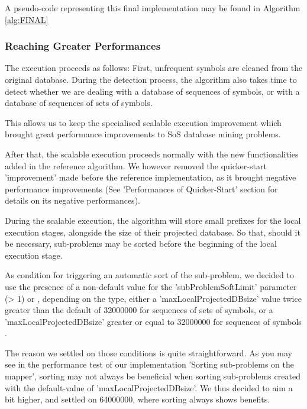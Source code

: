 \documentclass{eplmastersthesis}
\begin{document}
A pseudo-code representing this final implementation may be found in Algorithm \ref{alg:FINAL}

\subsubsection{Reaching Greater Performances}

The execution proceeds as follows: First, unfrequent symbols are cleaned from the original database. During the detection process, the algorithm also takes time to detect whether we are dealing with a database of sequences of symbols, or with a database of sequences of sets of symbols.\newline

This allows us to keep the specialised scalable execution improvement which brought great performance improvements to SoS database mining problems. \newline

After that, the scalable execution proceeds normally with the new functionalities added in the reference algorithm. We however removed the quicker-start 'improvement' made before the reference implementation, as it brought negative performance improvements (See 'Performances of Quicker-Start' section for details on its negative performances). \newline

During the scalable execution, the algorithm will store small prefixes for the local execution stages, alongside the size of their projected database. So that, should it be necessary, sub-problems may be sorted before the beginning of the local execution stage. \newline

As condition for triggering an automatic sort of the sub-problem, we decided to use the presence of a non-default value for the 'subProblemSoftLimit' parameter (> 1) or , depending on the type, either a 'maxLocalProjectedDBsize' value twice greater than the default of 32000000 for sequences of sets of symbols, or a 'maxLocalProjectedDBsize' greater or equal to 32000000 for sequences of symbols . \newline

The reason we settled on those conditions is quite straightforward. As you may see in the performance test of our implementation 'Sorting sub-problems on the mapper', sorting may not always be beneficial when sorting sub-problems created with the default-value of 'maxLocalProjectedDBsize'. We thus decided to aim a bit higher, and settled on 64000000, where sorting always shows benefits. \newline
\end{document}
